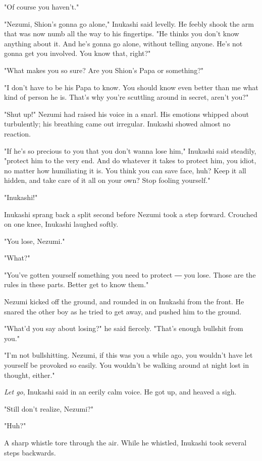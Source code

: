"Of course you haven't."

"Nezumi, Shion's gonna go alone," Inukashi said levelly. He feebly shook
the arm that was now numb all the way to his fingertips. "He thinks you
don't know anything about it. And he's gonna go alone, without telling
anyone. He's not gonna get you involved. You know that, right?"

"What makes you so sure? Are you Shion's Papa or something?"

"I don't have to be his Papa to know. You should know even better than
me what kind of person he is. That's why you're scuttling around in
secret, aren't you?"

"Shut up!" Nezumi had raised his voice in a snarl. His emotions whipped
about turbulently; his breathing came out irregular. Inukashi showed
almost no reaction.

"If he's so precious to you that you don't wanna lose him," Inukashi
said steadily, "protect him to the very end. And do whatever it takes to
protect him, you idiot, no matter how humiliating it is. You think you
can save face, huh? Keep it all hidden, and take care of it all on your
own? Stop fooling yourself."

"Inukashi!"

Inukashi sprang back a split second before Nezumi took a step forward.
Crouched on one knee, Inukashi laughed softly.

"You lose, Nezumi."

"What?"

"You've gotten yourself something you need to protect ― you lose. Those
are the rules in these parts. Better get to know them."

Nezumi kicked off the ground, and rounded in on Inukashi from the front.
He snared the other boy as he tried to get away, and pushed him to the
ground.

"What'd you say about losing?" he said fiercely. "That's enough bullshit
from you."

"I'm not bullshitting. Nezumi, if this was you a while ago, you wouldn't
have let yourself be provoked so easily. You wouldn't be walking around
at night lost in thought, either."

\emph{Let go}, Inukashi said in an eerily calm voice. He got up, and heaved a
sigh.

"Still don't realize, Nezumi?"

"Huh?"

A sharp whistle tore through the air. While he whistled, Inukashi took
several steps backwards.

